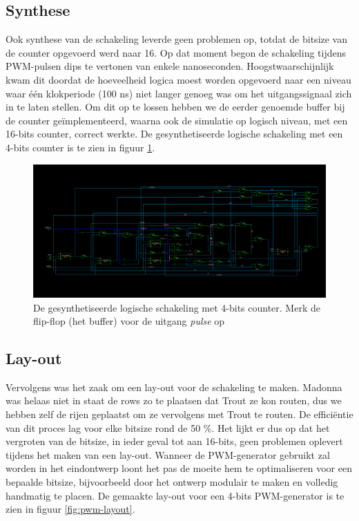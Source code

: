 \documentclass{article}
\begin{document}
\subsection{Synthese}
\label{ssec:pwm-impl-synth}
Ook synthese van de schakeling leverde geen problemen op, totdat de bitsize van de counter opgevoerd werd naar 16. Op dat moment begon de schakeling tijdens PWM-pulsen dips te vertonen van enkele nanoseconden. Hoogstwaarschijnlijk kwam dit doordat de hoeveelheid logica moest worden opgevoerd naar een niveau waar één klokperiode (100 ns) niet langer genoeg was om het uitgangssignaal zich in te laten stellen. Om dit op te lossen hebben we de eerder genoemde buffer bij de counter geïmplementeerd, waarna ook de simulatie op logisch niveau, met een 16-bits counter, correct werkte.
De gesynthetiseerde logische schakeling met een 4-bits counter is te zien in figuur \ref{fig:pwm-logic}.

\begin{figure}[H]
	\centering
	\includegraphics[width=\textwidth]{resource/pwm_gen_logic.png}
	\caption{De gesynthetiseerde logische schakeling met 4-bits counter. Merk de flip-flop (het buffer) voor de uitgang \textit{pulse} op}
	\label{fig:pwm-logic}
\end{figure}

\subsection{Lay-out}
\label{ssec:pwm-impl-layout}
Vervolgens was het zaak om een lay-out voor de schakeling te maken. Madonna was helaas niet in staat de rows zo te plaatsen dat Trout ze kon routen, dus we hebben zelf de rijen geplaatst om ze vervolgens met Trout te routen. De efficiëntie van dit proces lag voor elke bitsize rond de 50 \%. Het lijkt er dus op dat het vergroten van de bitsize, in ieder geval tot aan 16-bits, geen problemen oplevert tijdens het maken van een lay-out. Wanneer de PWM-generator gebruikt zal worden in het eindontwerp loont het pas de moeite hem te optimaliseren voor een bepaalde bitsize, bijvoorbeeld door het ontwerp modulair te maken en volledig handmatig te placen.
De gemaakte lay-out voor een 4-bits PWM-generator is te zien in figuur \ref{fig:pwm-layout}.
\end{document}
